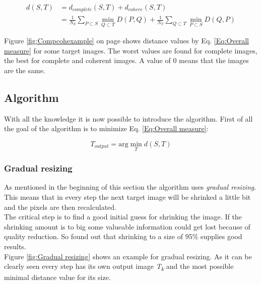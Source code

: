 \large
\begin{align}
\label{Eq:Overall measure}
d(S,T)&=d_{complete}(S,T)+d_{cohere}(S,T) \nonumber \\
&=\frac{1}{N_{S}}\sum_{P \subset S} \min\limits_{Q \subset T} D(P,Q)+\frac{1}{N_{T}}\sum_{Q \subset T} \min\limits_{P \subset S} D(Q,P)
\end{align}
\normalsize

Figure \ref{fig:Compcohexample} on page \pageref{fig:Compcohexample} shows distance values by Eq. \ref{Eq:Overall measure} for some target images. The worst values are found for complete images, the best for complete and coherent images. A value of 0 means that the images are the same.

\subsection{Algorithm}
With all the knowledge it is now possible to introduce the algorithm. First of all the goal of the algorithm is to minimize Eq. \ref{Eq:Overall measure}:

\large
\begin{equation}
\label{Eq:Minimize distance}
T_{output}=\text{arg} \min\limits_{T}d(S,T)
\end{equation}
\normalsize

\subsubsection{Gradual resizing}
As mentioned in the beginning of this section the algorithm uses \textit{gradual resizing}. This means that in every step the next target image will be shrinked a little bit and the pixels are then recalculated.\\
The critical step is to find a good initial guess for shrinking the image. If the shrinking amount is to big some valueable information could get lost because of quality reduction. So \cite{bisi} found out that shrinking to a size of 95\% supplies good results.\\
Figure \ref{fig:Gradual resizing} shows an example for gradual resizing. As it can be clearly seen every step has its own output image \textit{T\textsubscript{k}} and the most possible minimal distance value for its size.

